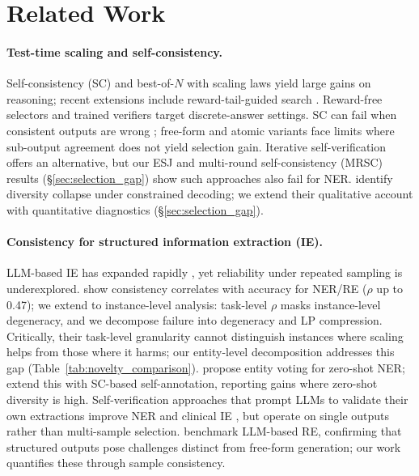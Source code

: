 \section{Related Work}\label{sec:related}

\paragraph{Test-time scaling and self-consistency.}\label{sec:yun_contrast}
Self-consistency (SC) \cite{wang2023selfconsistency} and best-of-$N$ with scaling laws \cite{snell2025scaling, brown2024monkeys, gao2023scaling} yield large gains on reasoning; recent extensions include reward-tail-guided search \cite{li2026rewardtail}. Reward-free selectors \cite{taubenfeld2025cisc, kang2025selfcertainty} and trained verifiers \cite{cobbe2021verifiers, lightman2024verify, li2023stepaware} target discrete-answer settings.
SC can fail when consistent outputs are wrong \cite{chen2023twofailures}; free-form \cite{chen2024usc} and atomic \cite{thirukovalluru2024atomic} variants face limits where sub-output agreement does not yield selection gain. Iterative self-verification \cite{shinn2023reflexion} offers an alternative, but our ESJ and multi-round self-consistency (MRSC) results (\S\ref{sec:selection_gap}) show such approaches also fail for NER.
\citet{yun2025price} identify diversity collapse under constrained decoding; we extend their qualitative account with quantitative diagnostics (\S\ref{sec:selection_gap}).

\paragraph{Consistency for structured information extraction (IE).}
LLM-based IE has expanded rapidly \cite{xu2024llmie}, yet reliability under repeated sampling is underexplored.
\citet{yao2026consistency} show consistency correlates with accuracy for NER/RE ($\rho$ up to 0.47); we extend to instance-level analysis: task-level $\rho$ masks instance-level degeneracy, and we decompose failure into degeneracy and LP compression.
Critically, their task-level granularity cannot distinguish instances where scaling helps from those where it harms; our entity-level decomposition addresses this gap (Table~\ref{tab:novelty_comparison}).
\citet{xie2023zeroshot} propose entity voting for zero-shot NER; \citet{xie2024selfimproving} extend this with SC-based self-annotation, reporting gains where zero-shot diversity is high.
Self-verification approaches that prompt LLMs to validate their own extractions improve NER \cite{wang2025gptner} and clinical IE \cite{gero2023selfverification}, but operate on single outputs rather than multi-sample selection.
\citet{wadhwa2023revisiting} benchmark LLM-based RE, confirming that structured outputs pose challenges distinct from free-form generation; our work quantifies these through sample consistency.

